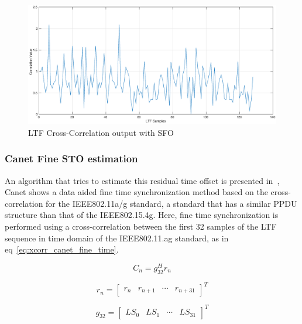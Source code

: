 \begin{figure}[hbt]
  \centering
    \includegraphics[width=1\textwidth]
      {./figures/correclation_result_sz128_err33_sto}
  \caption{LTF Cross-Correlation output with SFO}
  \label{fig:xcorr_sfo_exm}
\end{figure}

\subsubsection{Canet Fine STO estimation}
An algorithm that tries to estimate this residual time offset is presented in~\cite{time_sync_canet}, Canet shows a data aided fine time synchronization method based on the cross-correlation for the IEEE802.11a/g standard, a standard that has a similar PPDU structure than that of the IEEE802.15.4g. Here, fine time synchronization is performed using a cross-correlation between the first 32 samples of the LTF sequence in time domain of the IEEE802.11.ag standard, as in eq~\ref{eq:xcorr_canet_fine_time}. 

 \begin{equation} 
C_n = g_{32}^{H}r_n
    \label{eq:xcorr_canet_fine_time}
\end{equation}


\begin{equation}
     r_n=\begin{bmatrix}
         r_{n} & r_{n+1}  & \cdots &  r_{n+31}
        \end{bmatrix}^{T}
\end{equation}

\begin{equation}
     g_{32}=\begin{bmatrix}
         LS_{0} & LS_{1} &  \cdots &  LS_{31}
        \end{bmatrix}^{T}
\end{equation}

